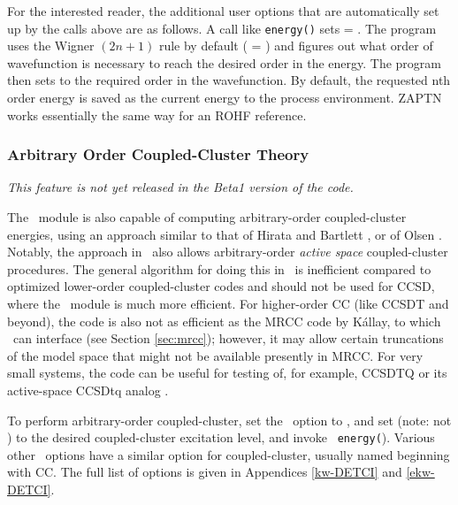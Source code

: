 For the interested reader, the additional user options that are
automatically set up by the calls above are as follows.  A call like
{\tt energy(\qq)} sets  = .
The program uses the Wigner $(2n+1)$ rule by default (
= ) and figures out what order of wavefunction is
necessary to reach the desired order in the energy.  The program then
sets  to the required order in the wavefunction.
By default, the requested n{th} order energy is saved as the current
energy to the process environment.   ZAPTN works essentially the same
way for an ROHF reference.

\subsubsection{Arbitrary Order Coupled-Cluster Theory} 
{\em This feature is not yet released in the Beta1 version of the code.}

The \PSIdetci\ module is also capable of computing arbitrary-order
coupled-cluster energies, using an approach similar to that of Hirata
and Bartlett \cite{Hirata:2000:216}, or of Olsen \cite{Olsen:2000:7140}.
Notably, the approach in \PSIdetci\ also allows arbitrary-order {\em
active space} coupled-cluster procedures.  The general algorithm
for doing this in \PSIdetci\ is inefficient compared to optimized
lower-order coupled-cluster codes and should not be used for CCSD,
where the \PSIccenergy\ module is much more efficient.  For higher-order
CC (like CCSDT and beyond), the code is also not as efficient as the
MRCC code by K{\'a}llay, to which \PSIfour\ can interface (see Section
\ref{sec:mrcc}); however, it may allow certain truncations of the model
space that might not be available presently in MRCC.  For very small
systems, the code can be useful for testing of, for example, CCSDTQ or
its active-space CCSDtq analog \cite{Piecuch:1999:6103}.

To perform arbitrary-order coupled-cluster, set the \PSIdetci\
option  to , and set
 (note: not )
to the desired coupled-cluster excitation level, and invoke {\tt
energy(\qq{detci}\qq}).  Various other \PSIdetci\ options have a similar
option for coupled-cluster, usually named beginning with CC.  The full
list of options is given in Appendices \ref{kw-DETCI} and \ref{ekw-DETCI}.


